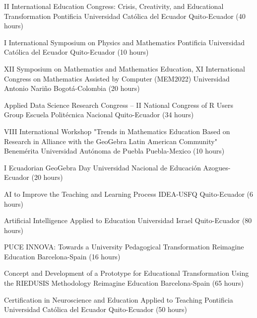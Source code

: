 \documentclass[
    a4paper,
    maincolor=cvblue!70!blue,
    sidecolor=gray!30,
    sectioncolor=cvblue!70!blue,
    sidebarwidth=7.5cm,
    topbottommargin=20pt,
    leftrightmargin=20pt,
]{fortysecondscv}
\begin{document}

    {II International Education Congress: Crisis, Creativity, and Educational Transformation}
    {Pontificia Universidad Católica del Ecuador}
    {Quito-Ecuador (40 hours)}

    {I International Symposium on Physics and Mathematics}
    {Pontificia Universidad Católica del Ecuador}
    {Quito-Ecuador (10 hours)}

    {XII Symposium on Mathematics and Mathematics Education, XI International Congress on Mathematics Assisted by Computer (MEM2022)}
    {Universidad Antonio Nariño}
    {Bogotá-Colombia (20 hours)}

    {Applied Data Science Research Congress – II National Congress of R Users Group}
    {Escuela Politécnica Nacional}
    {Quito-Ecuador (34 hours)}

    {VIII International Workshop "Trends in Mathematics Education Based on Research in Alliance with the GeoGebra Latin American Community"}
    {Benemérita Universidad Autónoma de Puebla}
    {Puebla-Mexico (10 hours)}

    {I Ecuadorian GeoGebra Day}
    {Universidad Nacional de Educación}
    {Azogues-Ecuador (20 hours)}


    {AI to Improve the Teaching and Learning Process}
    {IDEA-USFQ}
    {Quito-Ecuador (6 hours)}

    {Artificial Intelligence Applied to Education}
    {Universidad Israel}
    {Quito-Ecuador (80 hours)}

    {PUCE INNOVA: Towards a University Pedagogical Transformation}
    {Reimagine Education}
    {Barcelona-Spain (16 hours)}

    {Concept and Development of a Prototype for Educational Transformation Using the RIEDUSIS Methodology}
    {Reimagine Education}
    {Barcelona-Spain (65 hours)}

    {Certification in Neuroscience and Education Applied to Teaching}
    {Pontificia Universidad Católica del Ecuador}
    {Quito-Ecuador (50 hours)}
\end{document}
